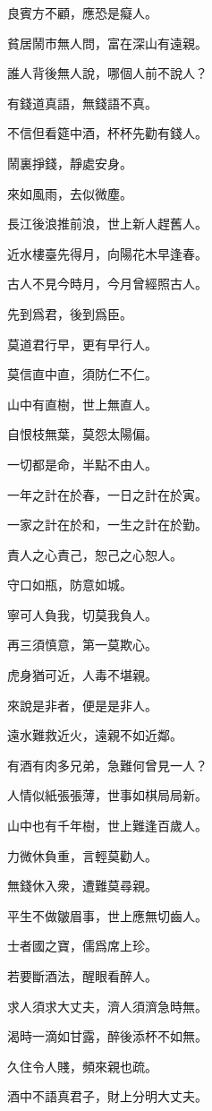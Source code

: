 \documentclass[12pt,a4paper]{ctexbook}
\begin{document}
良賓方不顧，應恐是癡人。\par
貧居鬧市無人問，富在深山有遠親。\par
誰人背後無人說，哪個人前不說人？\par
有錢道真語，無錢語不真。\par
不信但看筵中酒，杯杯先勸有錢人。\par
鬧裏掙錢，靜處安身。\par
來如風雨，去似微塵。\par
長江後浪推前浪，世上新人趕舊人。\par
近水樓臺先得月，向陽花木早逢春。\par
古人不見今時月，今月曾經照古人。\par
先到爲君，後到爲臣。\par
莫道君行早，更有早行人。\par
莫信直中直，須防仁不仁。\par
山中有直樹，世上無直人。\par
自恨枝無葉，莫怨太陽偏。\par
一切都是命，半點不由人。\par
一年之計在於春，一日之計在於寅。\par
一家之計在於和，一生之計在於勤。\par
責人之心責己，恕己之心恕人。\par
守口如瓶，防意如城。\par
寧可人負我，切莫我負人。\par
再三須慎意，第一莫欺心。\par
虎身猶可近，人毒不堪親。\par
來說是非者，便是是非人。\par
遠水難救近火，遠親不如近鄰。\par
有酒有肉多兄弟，急難何曾見一人？\par
人情似紙張張薄，世事如棋局局新。\par
山中也有千年樹，世上難逢百歲人。\par
力微休負重，言輕莫勸人。\par
無錢休入衆，遭難莫尋親。\par
平生不做皺眉事，世上應無切齒人。\par
士者國之寶，儒爲席上珍。\par
若要斷酒法，醒眼看醉人。\par
求人須求大丈夫，濟人須濟急時無。\par
渴時一滴如甘露，醉後添杯不如無。\par
久住令人賤，頻來親也疏。\par
酒中不語真君子，財上分明大丈夫。\par
\end{document}
